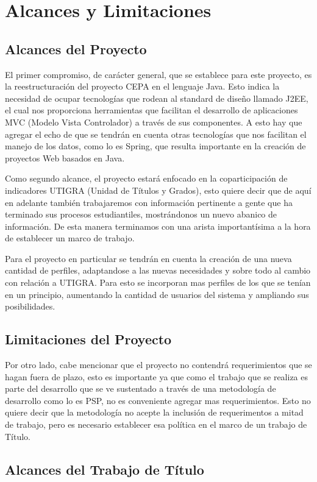 \documentclass[a4paper,12pt,openany,oneside]{book}
\begin{document}
\chapter{Alcances y Limitaciones}
\thispagestyle{empty}
\section{Alcances del Proyecto}
El primer compromiso, de carácter general, que se establece para este proyecto, es la reestructuración del proyecto CEPA en el lenguaje Java. Esto indica la necesidad de ocupar tecnologías que rodean al standard de diseño llamado J2EE, el cual nos proporciona herramientas que facilitan el desarrollo de aplicaciones MVC (Modelo Vista Controlador) a través de sus componentes. A esto hay que agregar el echo de que se tendrán en cuenta otras tecnologías que nos facilitan el manejo de los datos, como lo es Spring, que resulta importante en la creación de proyectos Web basados en Java.

Como segundo alcance, el proyecto estará enfocado en la coparticipación de indicadores UTIGRA (Unidad de Títulos y Grados), esto quiere decir que de aquí en adelante también trabajaremos con información pertinente a gente que ha terminado sus procesos estudiantiles, mostrándonos un nuevo abanico de información. De esta manera terminamos con una arista importantísima a la hora de establecer un marco de trabajo.

Para el proyecto en particular se tendrán en cuenta la creación de una nueva cantidad de perfiles, adaptandose a las nuevas necesidades y sobre todo al cambio con relación a UTIGRA. Para esto se incorporan mas perfiles de los que se tenían en un principio, aumentando la cantidad de usuarios del sistema y ampliando sus posibilidades.
\section{Limitaciones del Proyecto}
Por otro lado, cabe mencionar que el proyecto no contendrá requerimientos que se hagan fuera de plazo, esto es importante ya que como el trabajo que se realiza es parte del desarrollo que se ve sustentado a través de una metodología de desarrollo como lo es PSP, no es conveniente agregar mas requerimientos. Esto no quiere decir que la metodología no acepte la inclusión de requerimentos a mitad de trabajo, pero es necesario establecer esa política en el marco de un trabajo de Título.
\section{Alcances del Trabajo de Título}
\end{document}
